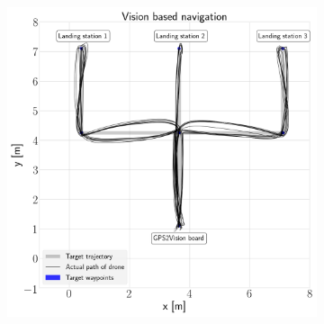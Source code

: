 \documentclass[../Head/report.tex]{subfiles}
\begin{document}
\begin{figure}[H]
\begin{subfigure}[t]{.30\textwidth}
        \caption{}
        \label{fig:vision_navigation_2d_path_missing_markers_wear_vel_1.0}
    \end{subfigure}
     \hspace{0.2em}
    \begin{subfigure}[t]{.30\textwidth}
        \centering
        \includegraphics[width=\textwidth]{../Figures/vision_navigation/test5_one_pattern_missing_markers_wear_board/2d_path.png}
        \caption{}
        \label{fig:vision_navigation_2d_path_missing_markers_wear_vel_5.0}
    \end{subfigure}
    \caption{}
    \label{fig:vision_navigation_2d_path}
\end{figure}
\end{document}
